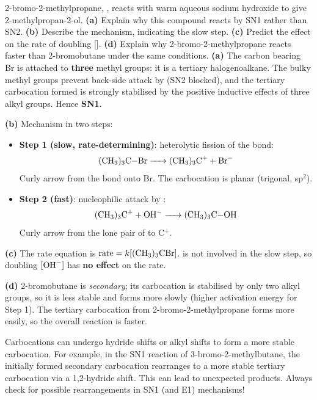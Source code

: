 \documentclass[11pt]{article}
\newcommand{\cle}[1]{{\popxbold\color{popdark}#1}}
\begin{document}
\begin{exoresolu}
2-bromo-2-methylpropane, , reacts with warm aqueous sodium hydroxide to give 2-methylpropan-2-ol.
\textbf{(a)} Explain why this compound reacts by SN1 rather than SN2. \textbf{(b)} Describe the mechanism, indicating the slow step. \textbf{(c)} Predict the effect on the rate of doubling []. \textbf{(d)} Explain why 2-bromo-2-methylpropane reacts faster than 2-bromobutane under the same conditions.
\tcblower
\textbf{(a)} The carbon bearing Br is attached to \textbf{three} methyl groups: it is a \cle{tertiary} halogenoalkane. The bulky methyl groups prevent back-side attack by  (SN2 blocked), and the tertiary carbocation formed is strongly stabilised by the positive inductive effects of three alkyl groups. Hence \textbf{SN1}.

\textbf{(b)} Mechanism in two steps:
\begin{itemize}
\item \textbf{Step 1 (slow, rate-determining)}: heterolytic fission of the  bond:
\[ \ce{(CH3)3C-Br -> (CH3)3C+ + Br-} \]
Curly arrow from the  bond onto Br. The carbocation is planar (trigonal, sp$^2$).
\item \textbf{Step 2 (fast)}: nucleophilic attack by :
\[ \ce{(CH3)3C+ + OH- -> (CH3)3C-OH} \]
Curly arrow from the lone pair of  to C$^+$.
\end{itemize}

\textbf{(c)} The rate equation is $\text{rate} = k[(\ce{CH3)3CBr}]$.  is not involved in the slow step, so doubling $[\ce{OH-}]$ has \textbf{no effect} on the rate.

\textbf{(d)} 2-bromobutane is \emph{secondary}; its carbocation is stabilised by only two alkyl groups, so it is less stable and forms more slowly (higher activation energy for Step 1). The tertiary carbocation from 2-bromo-2-methylpropane forms more easily, so the overall reaction is faster.
\end{exoresolu}

\begin{savaistu}
Carbocations can undergo \cle{hydride shifts} or \cle{alkyl shifts} to form a more stable carbocation. For example, in the SN1 reaction of 3-bromo-2-methylbutane, the initially formed secondary carbocation rearranges to a more stable tertiary carbocation via a 1,2-hydride shift. This can lead to unexpected products. Always check for possible rearrangements in SN1 (and E1) mechanisms!
\end{savaistu}
\end{document}

